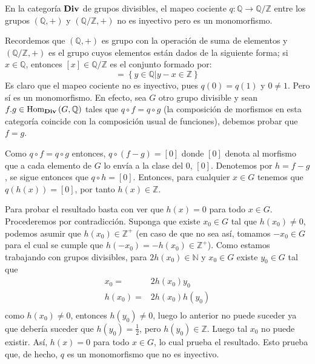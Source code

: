 \documentclass[12pt]{report}
\theoremstyle{largebreak}
\newcommand\cf[3]{\ensuremath{#1:#2\rightarrow#3}}
\newcommand{\Hom}[3]{\ensuremath{\textup{Hom}_{#1}\left(#2,#3\right)}}
\newcommand{\Cat}[1]{\ensuremath{\textup{\textbf{#1}}}}
\begin{document}
    \begin{exa}
        En la categoría $\Cat{Div}$ de grupos divisibles, el mapeo cociente $\cf{q}{\mathbb{Q}}{\mathbb{Q}/\mathbb{Z}}$ entre los grupos $(\mathbb{Q},+)$ y $(\mathbb{Q}/\mathbb{Z},+)$ no es inyectivo pero es un monomorfismo.
    \end{exa}

    \begin{sol}
        Recordemos que $(\mathbb{Q},+)$ es grupo con la operación de suma de elementos y $(\mathbb{Q}/\mathbb{Z},+)$ es el grupo cuyos elementos están dados de la siguiente forma; si $x\in\mathbb{Q}$, entonces $[x]\in\mathbb{Q}/\mathbb{Z}$ es el conjunto formado por:
        \begin{equation*}
            [x]=\left\{y\in\mathbb{Q}\big|y-x\in\mathbb{Z}  \right\}
        \end{equation*}
        Es claro que el mapeo cociente no es inyectivo, pues $q(0)=q(1)$ y $0\neq 1$. Pero sí es un monomorfismo. En efecto, sea $G$ otro grupo divisible y sean $f.g\in\Hom{\Cat{Div}}{G}{\mathbb{Q}}$ tales que $q\circ f = q\circ g$ (la composición de morfismos en esta categoría coincide con la composición usual de funciones), debemos probar que $f=g$.

        Como $q\circ f = q\circ g$ entonces, $q\circ(f-g)=[0]$ donde $[0]$ denota al morfismo que a cada elemento de $G$ lo envía a la clase del $0$, $[0]$. Denotemos por $h=f-g$, se sigue entonces que $q\circ h=[0]$. Entonces, para cualquier $x\in G$ tenemos que $q(h(x))=[0]$, por tanto $h(x)\in\mathbb{Z}$.
        
        Para probar el resultado basta con ver que $h(x)=0$ para todo $x\in G$. Procederemos por contradicción. Suponga que existe $x_0\in G$ tal que $h(x_0)\neq 0$, podemos asumir que $h(x_0)\in\mathbb{Z}^+$ (en caso de que no sea así, tomamos $-x_0\in G$ para el cual se cumple que $h(-x_0)=-h(x_0)\in\mathbb{Z}^+$). Como estamos trabajando con grupos divisibles, para $2h(x_0) \in\mathbb{N}$ y $x_0\in G$ existe $y_0\in G$ tal que
        \begin{equation*}
            \begin{split}
                x_0=&2h(x_0)y_0\\
                h(x_0)=&2h(x_0)h(y_0)\\
            \end{split}
        \end{equation*}
        como $h(x_0)\neq 0$, entonces $h(y_0)\neq 0$, luego lo anterior no puede suceder ya que debería suceder que $h(y_0)=\frac{1}{2}$, pero $h(y_0)\in\mathbb{Z}$. Luego tal $x_0$ no puede existir. Así, $h(x)=0$ para todo $x\in G$, lo cual prueba el resultado. Esto prueba que, de hecho, $q$ es un monomorfismo que no es inyectivo.
    \end{sol}
\end{document}
